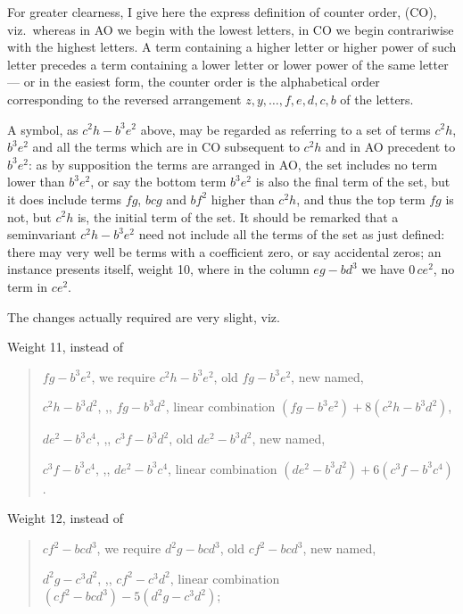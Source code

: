 \documentclass[11pt,a4paper]{article}
\begin{document}
For greater clearness, I give here the express definition of counter order, (CO), viz.\ whereas in AO we begin with the lowest letters, in CO we begin contrariwise with the highest letters. A term containing a higher letter or higher power of such letter precedes a term containing a lower letter or lower power of the same letter --- or in the easiest form, the counter order is the alphabetical order corresponding to the reversed arrangement $z, y, \ldots, f, e, d, c, b$ of the letters.

A symbol, as $c^2 h - b^3 e^2$ above, may be regarded as referring to a set of terms $c^2 h$, $b^3 e^2$ and all the terms which are in CO subsequent to $c^2 h$ and in AO precedent to $b^3 e^2$: as by supposition the terms are arranged in AO, the set includes no term lower than $b^3 e^2$, or say the bottom term $b^3 e^2$ is also the final term of the set, but it does include terms $fg$, $bcg$ and $bf^2$ higher than $c^2 h$, and thus the top term $fg$ is not, but $c^2 h$ is, the initial term of the set. It should be remarked that a seminvariant $c^2 h - b^3 e^2$ need not include all the terms of the set as just defined: there may very well be terms with a coefficient zero, or say accidental zeros; an instance presents itself, weight 10, where in the column $eg - bd^3$ we have $0\,c e^2$, no term in $ce^2$.

The changes actually required are very slight, viz.

Weight 11, instead of

\begin{quote}
$fg - b^3 e^2$, we require $c^2 h - b^3 e^2$, old $fg - b^3 e^2$, new named,

$c^2 h - b^3 d^2$, \quad ,, \quad $fg - b^3 d^2$, linear combination $(fg - b^3 e^2) + 8 (c^2 h - b^3 d^2)$,

$de^2 - b^3 c^4$, \quad ,, \quad $c^3 f - b^3 d^2$, old $de^2 - b^3 d^2$, new named,

$c^3 f - b^3 c^4$, \quad ,, \quad $de^2 - b^3 c^4$, linear combination $(de^2 - b^3 d^2) + 6 (c^3 f - b^3 c^4)$.
\end{quote}

Weight 12, instead of

\begin{quote}
$cf^2 - bcd^3$, we require $d^2 g - bcd^3$, old $cf^2 - bcd^3$, new named,

$d^2 g - c^3 d^2$, \quad ,, \quad $cf^2 - c^3 d^2$, linear combination $(cf^2 - bcd^3) - 5 (d^2 g - c^3 d^2)$;
\end{quote}
\end{document}
